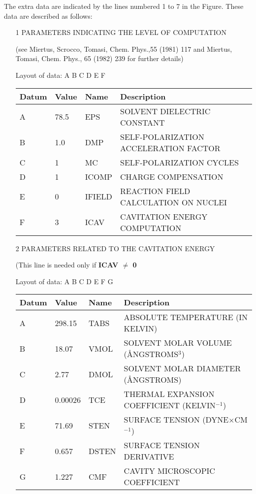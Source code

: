 The extra data are indicated by the lines numbered 1 to 7 in the Figure.  These
data are described as follows:
\begin{enumerate}
\item[1] PARAMETERS INDICATING THE LEVEL OF COMPUTATION

   (see Miertus, Scrocco, Tomasi, Chem. Phys.,55 (1981) 117 and
     Miertus, Tomasi, Chem. Phys., 65 (1982) 239 for further details)

Layout of data:   A B C D E F

\begin{center}
\begin{tabular}{llll}  \hline
 Datum & Value & Name   &  Description  \\ \hline
    A  & 78.5  & EPS    & SOLVENT DIELECTRIC CONSTANT          \\
    B  & 1.0   & DMP    & SELF-POLARIZATION ACCELERATION FACTOR\\
    C  & 1     & MC     & SELF-POLARIZATION CYCLES             \\
    D  & 1     & ICOMP  & CHARGE COMPENSATION                  \\
    E  & 0     & IFIELD & REACTION FIELD CALCULATION ON NUCLEI \\
    F  & 3     & ICAV   & CAVITATION ENERGY COMPUTATION        \\  \hline 
\end{tabular}
\end{center}

\item[2] PARAMETERS RELATED TO THE CAVITATION ENERGY

(This line is needed only if {\bf ICAV $\ne$ 0} 

Layout of data: A B C D E F G                                                      

\begin{center}\begin{tabular}{llll}  \hline
 Datum & Value &Name   &  Description  \\  \hline
  A   & 298.15 & TABS  &  ABSOLUTE TEMPERATURE (IN KELVIN)           \\
  B   &  18.07 & VMOL  &  SOLVENT MOLAR VOLUME (\AA NGSTROMS$^3$) \\  
  C   &  2.77  &  DMOL  &  SOLVENT MOLAR DIAMETER (\AA NGSTROMS)         \\
  D   & 0.00026 & TCE   &  THERMAL EXPANSION COEFFICIENT (KELVIN$^{-1}$) \\ 
  E   & 71.69   & STEN  &  SURFACE TENSION (DYNE$\times$CM$^{-1}$)           \\
  F   & 0.657  & DSTEN &  SURFACE TENSION DERIVATIVE                 \\
  G   & 1.227  & CMF    & CAVITY MICROSCOPIC COEFFICIENT             \\ \hline
\end{tabular}
\end{center}


\end{enumerate}
